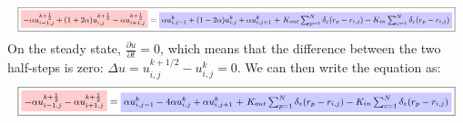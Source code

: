 \documentclass{beamer}
\begin{document}
\begin{frame}
    \begin{align*}
        \resizebox{\textwidth}{!}{%
$\boxed{\small 
\colorbox{red!20}{$ -\alpha u_{i-1,j}^{k+\frac{1}{2}} + (1 + 2\alpha)u_{i,j}^{k+\frac{1}{2}} - 
\alpha u_{i+1,j}^{k+\frac{1}{2}} $}= 
\colorbox{blue!20}{$\alpha u_{i,j-1}^k + (1 - 2\alpha)u_{i,j}^k + \alpha u_{i,j+1}^k$
+ $K_{out} \sum_{p=1}^{N} \delta_{\varepsilon}(r_p - r_{i,j}) - K_{in} \sum_{c=1}^{N}\delta_{\varepsilon}(r_p - r_{i,j})$}}$}
\end{align*}
On the steady state, $\frac{\partial u}{\partial t} = 0$, which means that the difference between the two half-steps is zero:
$\Delta u = u^{k+1/2}_{i,j} - u^{k}_{i,j} = 0$. We can then write the equation as:    
\begin{align*}
    \resizebox{\textwidth}{!}{%
$\boxed{\small 
\colorbox{red!20}{$ -\alpha u_{i-1,j}^{k+\frac{1}{2}}  - 
\alpha u_{i+1,j}^{k+\frac{1}{2}} $}= 
\colorbox{blue!20}{$\alpha u_{i,j-1}^k  - 4\alpha u_{i,j}^k + \alpha u_{i,j+1}^k$
+ $K_{out} \sum_{p=1}^{N} \delta_{\varepsilon}(r_p - r_{i,j}) - K_{in} \sum_{c=1}^{N}\delta_{\varepsilon}(r_p - r_{i,j})$}}$}
\end{align*}
\end{frame}
\end{document}
